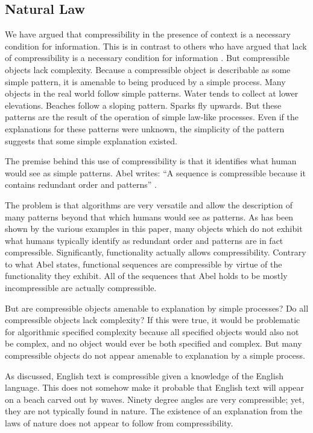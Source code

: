 \subsection{Natural Law}
We have argued that compressibility in the presence of context is a necessary condition for information.
This is in contrast to others who have argued that lack of compressibility is a necessary condition for information \citep{Abel2005}.
But compressible objects lack complexity.
Because a compressible object is describable as some simple pattern, it is amenable to being produced by a simple process.
Many objects in the real world follow simple patterns.
Water tends to collect at lower elevations.
Beaches follow a sloping pattern.
Sparks fly upwards.
But these patterns are the result of the operation of simple law-like processes.
Even if the explanations for these patterns were unknown, the simplicity of the pattern suggests that some simple explanation existed.

The premise behind this use of compressibility is that it identifies what human would see as simple patterns.
Abel writes: ``A sequence is compressible because it contains redundant order and patterns'' \citep{Abel2005}.

The problem is that algorithms are very versatile and allow the description of many patterns beyond that which humans would see as patterns.
As has been shown by the various examples in this paper, many objects which do not exhibit what humans typically identify as redundant order and patterns are in fact compressible.
Significantly, functionality actually allows compressibility.
Contrary to what Abel states, functional sequences are compressible by virtue of the functionality they exhibit.
All of the sequences that Abel holds to be mostly incompressible are actually compressible.

But are compressible objects amenable to explanation by simple processes?
Do all compressible objects lack complexity?
If this were true, it would be problematic for algorithmic specified complexity because all specified objects would also not be complex, and no object would ever be both specified and complex.
But many compressible objects do not appear amenable to explanation by a simple process.

As discussed, English text is compressible given a knowledge of the English language.
This does not somehow make it probable that English text will appear on a beach carved out by waves.
Ninety degree angles are very compressible; yet, they are not typically found in nature.
The existence of an explanation from the laws of nature does not appear to follow from compressibility.

